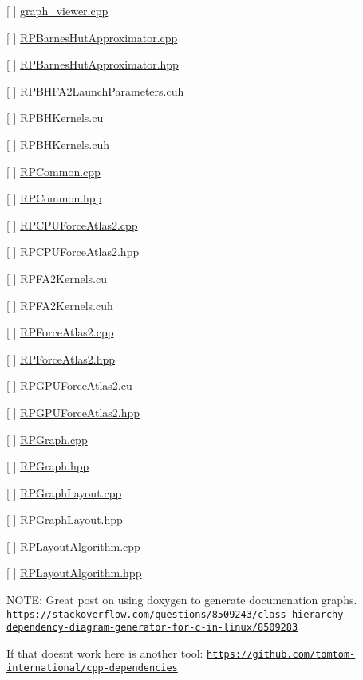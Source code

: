 
\begin{DoxyItemize}
\item \mbox{[} \mbox{]} \mbox{\hyperlink{graph__viewer_8cpp}{graph\+\_\+viewer.\+cpp}}
\item \mbox{[} \mbox{]} \mbox{\hyperlink{RPBarnesHutApproximator_8cpp}{R\+P\+Barnes\+Hut\+Approximator.\+cpp}}
\item \mbox{[} \mbox{]} \mbox{\hyperlink{RPBarnesHutApproximator_8hpp}{R\+P\+Barnes\+Hut\+Approximator.\+hpp}}
\item \mbox{[} \mbox{]} R\+P\+B\+H\+F\+A2\+Launch\+Parameters.\+cuh
\item \mbox{[} \mbox{]} R\+P\+B\+H\+Kernels.\+cu
\item \mbox{[} \mbox{]} R\+P\+B\+H\+Kernels.\+cuh
\item \mbox{[} \mbox{]} \mbox{\hyperlink{RPCommon_8cpp}{R\+P\+Common.\+cpp}}
\item \mbox{[} \mbox{]} \mbox{\hyperlink{RPCommon_8hpp}{R\+P\+Common.\+hpp}}
\item \mbox{[} \mbox{]} \mbox{\hyperlink{RPCPUForceAtlas2_8cpp}{R\+P\+C\+P\+U\+Force\+Atlas2.\+cpp}}
\item \mbox{[} \mbox{]} \mbox{\hyperlink{RPCPUForceAtlas2_8hpp}{R\+P\+C\+P\+U\+Force\+Atlas2.\+hpp}}
\item \mbox{[} \mbox{]} R\+P\+F\+A2\+Kernels.\+cu
\item \mbox{[} \mbox{]} R\+P\+F\+A2\+Kernels.\+cuh
\item \mbox{[} \mbox{]} \mbox{\hyperlink{RPForceAtlas2_8cpp}{R\+P\+Force\+Atlas2.\+cpp}}
\item \mbox{[} \mbox{]} \mbox{\hyperlink{RPForceAtlas2_8hpp}{R\+P\+Force\+Atlas2.\+hpp}}
\item \mbox{[} \mbox{]} R\+P\+G\+P\+U\+Force\+Atlas2.\+cu
\item \mbox{[} \mbox{]} \mbox{\hyperlink{RPGPUForceAtlas2_8hpp}{R\+P\+G\+P\+U\+Force\+Atlas2.\+hpp}}
\item \mbox{[} \mbox{]} \mbox{\hyperlink{RPGraph_8cpp}{R\+P\+Graph.\+cpp}}
\item \mbox{[} \mbox{]} \mbox{\hyperlink{RPGraph_8hpp}{R\+P\+Graph.\+hpp}}
\item \mbox{[} \mbox{]} \mbox{\hyperlink{RPGraphLayout_8cpp}{R\+P\+Graph\+Layout.\+cpp}}
\item \mbox{[} \mbox{]} \mbox{\hyperlink{RPGraphLayout_8hpp}{R\+P\+Graph\+Layout.\+hpp}}
\item \mbox{[} \mbox{]} \mbox{\hyperlink{RPLayoutAlgorithm_8cpp}{R\+P\+Layout\+Algorithm.\+cpp}}
\item \mbox{[} \mbox{]} \mbox{\hyperlink{RPLayoutAlgorithm_8hpp}{R\+P\+Layout\+Algorithm.\+hpp}}
\end{DoxyItemize}

N\+O\+TE\+: Great post on using doxygen to generate documenation graphs. \href{https://stackoverflow.com/questions/8509243/class-hierarchy-dependency-diagram-generator-for-c-in-linux/8509283}{\tt https\+://stackoverflow.\+com/questions/8509243/class-\/hierarchy-\/dependency-\/diagram-\/generator-\/for-\/c-\/in-\/linux/8509283}

If that doesn\textquotesingle{}t work here is another tool\+: \href{https://github.com/tomtom-international/cpp-dependencies}{\tt https\+://github.\+com/tomtom-\/international/cpp-\/dependencies} 